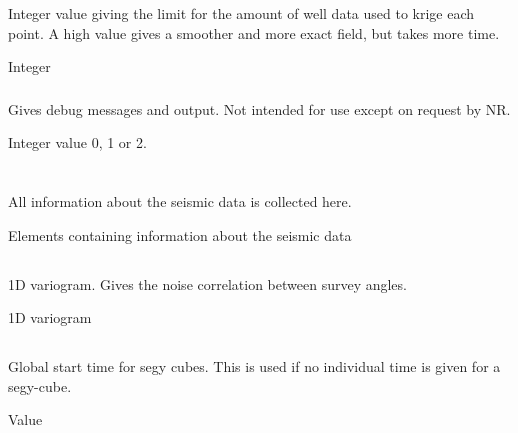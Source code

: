 \subsubsection{}
 \slist
   \item \Description Integer value giving the limit for the amount of well data used to krige each point. A high value gives a smoother and more exact field, but takes more time.
   \item \Argument Integer
   \item {}
 \elist

\subsubsection{}
 \slist
   \item \Description Gives debug messages and output. Not intended for use except on request by NR.
   \item \Argument Integer value 0, 1 or 2.
   \item {}
 \elist

 \section{\necessary} 
 \slist
   \item \Description All information about the seismic data is collected here.
   \item \Argument Elements containing information about the seismic data
   \item \Default
 \elist

 \subsection{}
 \slist
   \item \Description 1D variogram. Gives the noise correlation between survey angles.
   \item \Argument 1D variogram
   \item \Default
 \elist

 \subsection{}
 \slist
   \item \Description Global start time for segy cubes. This is used if no individual time is given for a segy-cube.
   \item \Argument Value
   \item \Default
 \elist

